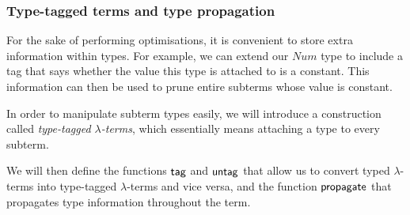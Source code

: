 \documentclass[main.tex]{subfiles}
\begin{document}
\subsubsection{Type-tagged terms and type propagation}
\label{sec:propagation}
For the sake of performing optimisations, it is convenient to store extra
information within types. For example, we can extend our $Num$ type to include
a tag that says whether the value this type is attached to is a constant. This
information can then be used to prune entire subterms whose value is constant.

In order to manipulate subterm types easily, we will introduce a construction
called \emph{type-tagged $\lambda$-terms}, which essentially means attaching
a type to every subterm.

We will then define the functions $\mathsf{tag}$ and $\mathsf{untag}$ that allow us
to convert typed $\lambda$-terms into type-tagged $\lambda$-terms and vice
versa, and the function $\mathsf{propagate}$ that propagates type information
throughout the term.
\end{document}
